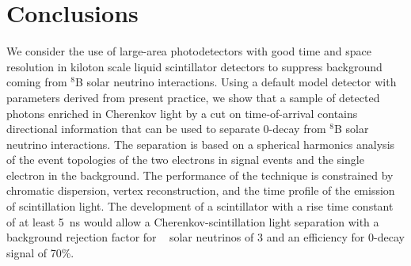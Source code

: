 \section{Conclusions}
\label{sec:conclusions}
We consider the use of large-area photodetectors with good time and
space resolution in kiloton scale liquid scintillator detectors to
suppress background coming from $^{8}$B solar neutrino
interactions. Using a default model detector with parameters derived
from present practice, we show that a sample of detected photons
enriched in Cherenkov light by a cut on time-of-arrival contains
directional information that can be used to separate 0\nbb-decay from
$^{8}$B solar neutrino interactions. The separation is based on a
spherical harmonics analysis of the event topologies of the
two electrons in signal events and the single electron in the
background. The performance of the technique is constrained by
chromatic dispersion, vertex reconstruction, and the time profile of
the emission of scintillation light. The development of a scintillator
with a rise time constant of at least 5~ns would allow a
Cherenkov-scintillation light separation with a background rejection
factor for \B~ solar neutrinos of 3 and an efficiency for 0\nbb-decay signal
of 70\%.


